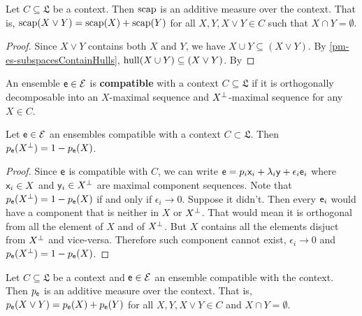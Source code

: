 \begin{prop}
	Let $C \subseteq \mathfrak{L}$ be a context. Then $\scap$ is an additive measure over the context. That is, $\scap(X \vee Y) = \scap(X) + \scap(Y)$ for all $X, Y, X \vee Y \in C$ such that $X \cap Y = \emptyset$.
\end{prop}

\begin{proof}
	Since $X \vee Y$ contains both $X$ and $Y$, we have $X \cup Y \subseteq(X \vee Y)$. By \ref{pm-es-subspacesContainHulls}, $\hull(X \cup Y) \subseteq(X \vee Y)$. By 
\end{proof}

\begin{defn}
	An ensemble $\ens \in \Ens$ is \textbf{compatible} with a context $C \subseteq \mathfrak{L}$ if it is orthogonally decomposable into an $X$-maximal sequence and $X^{\ortho}$-maximal sequence for any $X \in C$.
\end{defn}

\begin{coro}
	Let $\ens \in \Ens$ an ensembles compatible with a context $C \subset \mathfrak{L}$. Then $p_{\ens}(X^\ortho) = 1 - p_{\ens}(X)$.
\end{coro}

\begin{proof}
	Since $\ens$ is compatible with $C$, we can write $\ens = p_i \ens[x]_i + \lambda_i \ens[y] + \epsilon_i \ens_i$ where $\ens[x]_i \in X$ and $\ens[y]_i \in X^\ortho$ are maximal component sequences. Note that $p_{\ens}(X^\ortho) = 1 - p_{\ens}(X)$ if and only if $\epsilon_i \to 0$. Suppose it didn't. Then every $\ens_i$ would have a component that is neither in $X$ or $X^\ortho$. That would mean it is orthogonal from all the element of $X$ and of $X^\ortho$. But $X$ contains all the elements disjuct from $X^\ortho$ and vice-versa. Therefore such component cannot exist, $\epsilon_i \to 0$ and $p_{\ens}(X^\ortho) = 1 - p_{\ens}(X)$.
\end{proof}

\begin{conj}
	Let $C \subseteq \mathfrak{L}$ be a context and $\ens \in \Ens$ an ensemble compatible with the context. Then $p_{\ens}$ is an additive measure over the context. That is, $p_{\ens}(X \vee Y) = p_{\ens}(X) + p_{\ens}(Y)$ for all $X, Y, X \vee Y \in C$ and $X \cap Y = \emptyset$.
\end{conj}

